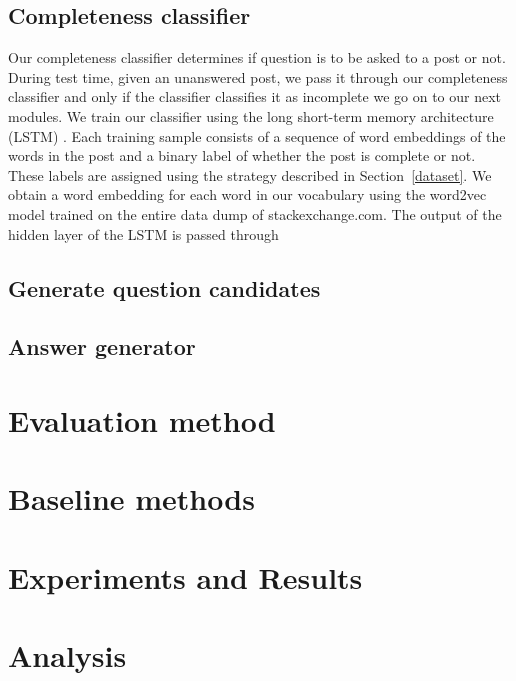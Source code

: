 \documentclass[11pt]{article}
\begin{document}
\subsection{Completeness classifier}
Our completeness classifier determines if question is to be asked to a post or not. During test time, given an unanswered post, we pass it through our completeness classifier and only if the classifier classifies it as incomplete we go on to our next modules. We train our classifier using the long short-term memory architecture (LSTM) \cite{hochreiter1997long}. Each training sample consists of a sequence of word embeddings of the words in the post and a binary label of whether the post is complete or not. These labels are assigned using the strategy described in Section~\ref{dataset}. We obtain a word embedding for each word in our vocabulary using the word2vec \cite{mikolov2013efficient} model trained on the entire data dump of stackexchange.com. 
The output of the hidden layer of the LSTM is passed through 

\subsection{Generate question candidates}

\subsection{Answer generator}

\subsection{}

\section{Evaluation method}

\section{Baseline methods}

\section{Experiments and Results}\label{experiments_results}

\section{Analysis}
\end{document}
